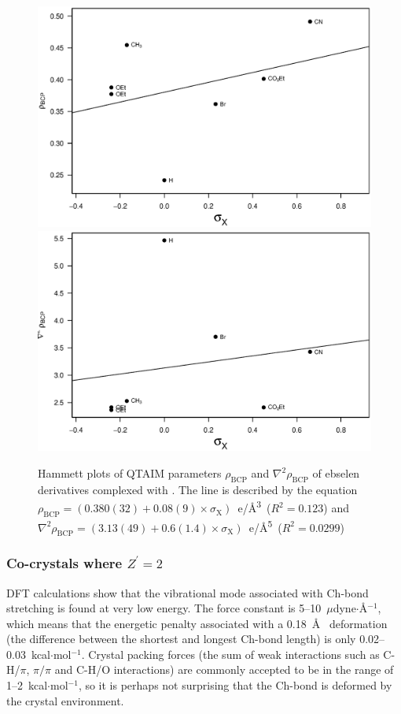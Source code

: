 \begin{refsection}
\begin{figure}
  \centering
  \includegraphics[width=0.9\linewidth]{Figures/hammett-rho-pyrrol.eps}
  \includegraphics[width=0.9\linewidth]{Figures/hammett-lapl-pyrrol.eps}
  \caption[Hammett plots of QTAIM parameters $\rho_\text{BCP}$ and $\nabla^2\rho_{\text{BCP}}$ of ebselen derivatives complexed with .]{Hammett plots of QTAIM parameters $\rho_\text{BCP}$ and $\nabla^2\rho_{\text{BCP}}$ of ebselen derivatives complexed with . The line is described by the equation $\rho_{\text{BCP}} = (0.380(32) + 0.08(9) \times \sigma_{\mathrm{X}})$~e/\AA\textsuperscript{3}~($R^2=0.123$) and $\nabla^2\rho_{\text{BCP}} = (3.13(49) + 0.6(1.4) \times \sigma_{\mathrm{X}})$~e/\AA\textsuperscript{5}~($R^2=0.0299$)}
  \label{fig:hammett-qtaim-pyrrol}
\end{figure}

\subsubsection{Co-crystals where \texorpdfstring{$Z^\prime=2$}{Z'=2}}
\label{sec:z2}
DFT calculations show that the vibrational mode associated with Ch-bond stretching is found at very low energy.
The force constant is 5--10~$\mu$dyne$\cdot$\AA$^{-1}$, which means that the energetic penalty associated with a 0.18~\AA~ deformation (the difference between the shortest and longest Ch-bond length) is only 0.02--0.03~kcal$\cdot$mol$^{-1}$.
Crystal packing forces (the sum of weak interactions such as C-H/$\pi$, $\pi /\pi$ and C-H/O interactions) are commonly accepted to be in the range of 1--2~kcal$\cdot$mol$^{-1}$, so it is perhaps not surprising that the Ch-bond is deformed by the crystal environment.\autocite{Dunitz1988}


\end{refsection}
